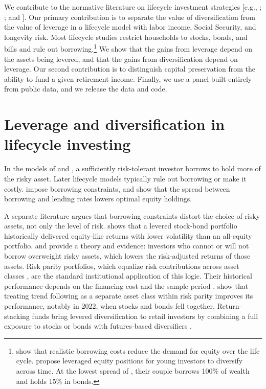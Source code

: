 \documentclass[12pt]{article}
\begin{document}
We contribute to the normative literature on lifecycle investment strategies
[e.g., \citet{CoccoGomesMaenhout2005}; \citet{Gomes2020}; and \citet{AnarkulovaCederburgODoherty2025}].
Our primary contribution is to separate the value of diversification from the value of leverage in a
lifecycle model with labor income, Social Security, and longevity risk. Most lifecycle studies restrict
households to stocks, bonds, and bills and rule out borrowing.\footnote{\citet{DavisKublerWillen2006}
show that realistic borrowing costs reduce the demand for equity over the life cycle.
\citet{AyresNalebuff2010,AyresNalebuff2013} propose leveraged equity positions for young investors to
diversify across time. At the lowest spread of \citet{AnarkulovaCederburgODoherty2025}, their couple
borrows 100\% of wealth and holds 15\% in bonds.} We show that the gains from leverage depend on the assets
being levered, and that the gains from diversification depend on leverage. Our second contribution is to
distinguish capital preservation from the ability to fund a given retirement income. Finally, we use a
panel built entirely from public data, and we release the data and code.

\section{Leverage and diversification in lifecycle investing}

In the models of \citet{Merton1969} and \citet{Samuelson1969}, a sufficiently risk-tolerant investor
borrows to hold more of the risky asset. Later lifecycle models typically rule out borrowing or make it
costly. \citet{CoccoGomesMaenhout2005} impose borrowing constraints, and \citet{DavisKublerWillen2006}
show that the spread between borrowing and lending rates lowers optimal equity holdings.

A separate literature argues that borrowing constraints distort the choice of risky assets, not only
the level of risk. \citet{Asness1996} shows that a levered stock-bond portfolio historically delivered
equity-like returns with lower volatility than an all-equity portfolio. \citet{FrazziniPedersen2014}
and \citet{AsnessFrazziniPedersen2012} provide a theory and evidence: investors who cannot or will not
borrow overweight risky assets, which lowers the risk-adjusted returns of those assets. Risk parity
portfolios, which equalize risk contributions across asset classes
\citep{MaillardRoncalliTeiletche2010}, are the standard institutional application of this logic. Their
historical performance depends on the financing cost and the sample period
\citep{AndersonBianchiGoldberg2012}. \citet{BhansaliEtAl2024} show that treating trend following as a
separate asset class within risk parity improves its performance, notably in 2022, when stocks and bonds
fell together. Return-stacking funds bring levered diversification to retail investors by combining a
full exposure to stocks or bonds with futures-based diversifiers \citep{GordilloHoffstein2021}.
\end{document}
